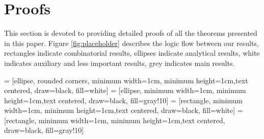 \documentclass[12pt, reqno]{article}
\begin{document}
\section{Proofs}
This section is devoted to providing detailed proofs of all the theorems presented in this paper. Figure \ref{fig:placeholder} describes the logic flow between our results, rectangles indicate combinatorial results, ellipses indicate analytical results, white indicates auxiliary and less important results, grey indicates main results.

 = [ellipse, rounded corners, minimum width=1cm, minimum height=1cm,text centered, draw=black, fill=white]
 = [ellipse, minimum width=1cm, minimum height=1cm,text centered, draw=black, fill=gray!10]
 = [rectangle, minimum width=1cm, minimum height=1cm,text centered, draw=black, fill=white]
 = [rectangle, minimum width=1cm, minimum height=1cm,text centered, draw=black, fill=gray!10]
\end{document}

